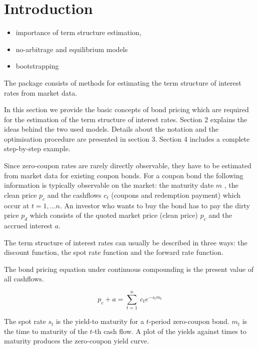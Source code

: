 \newpage
\section{Introduction}

\begin{itemize}
\item importance of term structure estimation, \cite{BIS2005, Bolder1999, Bliss1997, Ioannides2003, Diebold2006, Nawalkha2005}
\item no-arbitrage and equilibrium models 
\item bootstrapping
\end{itemize}

\cite{BIS2005}


The  package  consists of methods for estimating the term structure of interest rates from market data.

In this section we provide the basic concepts of bond pricing which are required for the estimation of the term structure of interest rates. Section 2 explains the ideas behind the two used models. Details about the notation and the optimisation procedure are presented in section 3. Section 4 includes a complete step-by-step example.


Since zero-coupon rates are rarely directly observable, they have to be estimated from market data for existing coupon bonds. For a coupon bond the following information is typically observable on the market: the maturity date $m$ , the clean price $p_c$ and the cashflows $c_t$ (coupons and redemption payment) which occur at $t=1,...n$. An investor who wants to buy the bond has to pay the dirty price $p_d$ which consists of the quoted market price (clean price) $p_c$ and the accrued interest $a$.

The term structure of interest rates can usually be described in three ways: the discount function, the
spot rate function and the forward rate function.

The bond pricing equation under continuous compounding is the present value of all cashflows.

\begin{equation}
  \label{bondpriceeq}
  p_c+a = \sum_{t=1}^n \ c_t e^{-s_tm_t}
\end{equation}

The spot rate $s_t$ is the yield-to maturity for a $t$-period zero-coupon bond. $m_t$ is the time to maturity of the $t$-th cash flow. A plot of the yields against times to maturity produces the zero-coupon yield curve.

